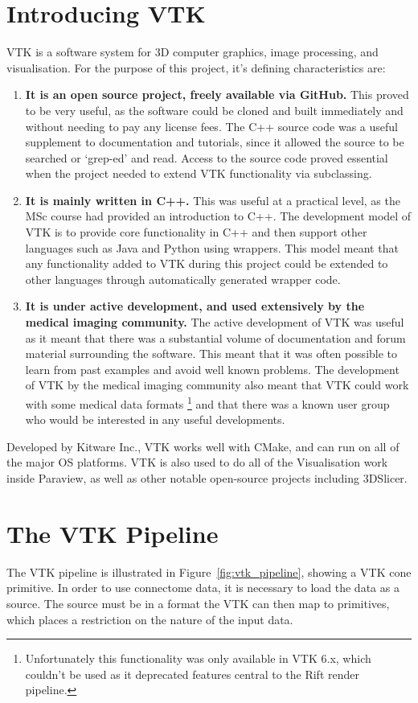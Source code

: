 \documentclass[MSc,paper=a4,pagesize=auto]{icldt}
\begin{document}
\section{Introducing VTK}
VTK is a software system for 3D computer graphics, image processing, and visualisation. For the purpose of this project, it's defining characteristics are:
\begin{enumerate}
\item \textbf{It is an open source project, freely available via GitHub.} This proved to be very useful, as the software could be cloned and built immediately and without needing to pay any license fees. The C++ source code was a useful supplement to documentation and tutorials, since it allowed the source to be searched or `grep-ed' and read. Access to the source code proved essential when the project needed to extend VTK functionality via subclassing. 
\item \textbf{It is mainly written in C++.} This was useful at a practical level, as the MSc course had provided an introduction to C++. The development model of VTK is to provide core functionality in C++ and then support other languages such as Java and Python using wrappers. This model meant that any functionality added to VTK during this project could be extended to other languages through automatically generated wrapper code.
\item \textbf{It is under active development, and used extensively by the medical imaging community.} The active development of VTK was useful as it meant that there was a substantial volume of documentation and forum material surrounding the software. This meant that it was often possible to learn from past examples and avoid well known problems. The development of VTK by the medical imaging community also meant that VTK could work with some medical data formats \footnote{Unfortunately this functionality was only available in VTK 6.x, which couldn't be used as it deprecated features central to the Rift render pipeline.} and that there was a known user group who would be interested in any useful developments.
\end{enumerate}

Developed by Kitware Inc., VTK works well with CMake, and can run on all of the major OS platforms. VTK is also used to do all of the Visualisation work inside Paraview, as well as other notable open-source projects including 3DSlicer.

\section{The VTK Pipeline}
The VTK pipeline is illustrated in Figure~\ref{fig:vtk_pipeline}, showing a VTK cone primitive. In order to use connectome data, it is necessary to load the data as a source. The source must be in a format the VTK can then map to primitives, which places a restriction on the nature of the input data.
\end{document}

